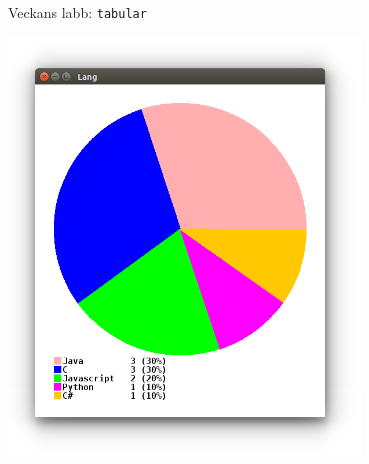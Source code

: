 \begin{Slide}{Veckans labb: \texttt{tabular}}
\begin{minipage}{0.3\textwidth}
\vspace{2em}\includegraphics[width=0.7\textwidth]{../img/survey/pie}
\end{minipage}
\end{Slide}
